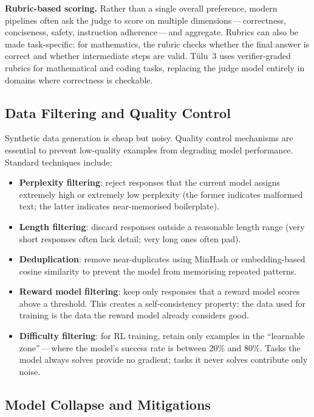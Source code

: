 \textbf{Rubric-based scoring.} Rather than a single overall preference, modern pipelines often ask the judge to score on multiple dimensions\,---\,correctness, conciseness, safety, instruction adherence\,---\,and aggregate. Rubrics can also be made task-specific: for mathematics, the rubric checks whether the final answer is correct and whether intermediate steps are valid. T\"{u}lu~3 uses verifier-graded rubrics for mathematical and coding tasks, replacing the judge model entirely in domains where correctness is checkable.

\subsection{Data Filtering and Quality Control}

Synthetic data generation is cheap but noisy. Quality control mechanisms are essential to prevent low-quality examples from degrading model performance. Standard techniques include:

\begin{itemize}[leftmargin=*]
  \item \textbf{Perplexity filtering}: reject responses that the current model assigns extremely high or extremely low perplexity (the former indicates malformed text; the latter indicates near-memorised boilerplate).
  \item \textbf{Length filtering}: discard responses outside a reasonable length range (very short responses often lack detail; very long ones often pad).
  \item \textbf{Deduplication}: remove near-duplicates using MinHash or embedding-based cosine similarity to prevent the model from memorising repeated patterns.
  \item \textbf{Reward model filtering}: keep only responses that a reward model scores above a threshold. This creates a self-consistency property: the data used for training is the data the reward model already considers good.
  \item \textbf{Difficulty filtering}: for RL training, retain only examples in the ``learnable zone''\,---\,where the model's success rate is between 20\% and 80\%. Tasks the model always solves provide no gradient; tasks it never solves contribute only noise.
\end{itemize}

\subsection{Model Collapse and Mitigations}

